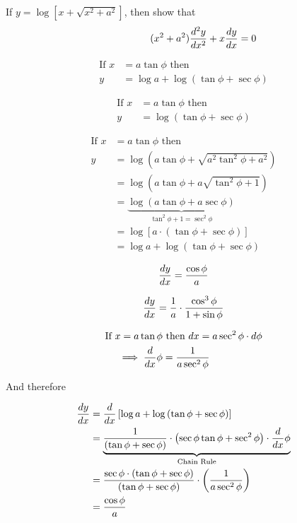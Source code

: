 \documentclass[14pt,fleqn]{extarticle}
\begin{document}
\newcommand\ea{x+\sqrt{x^2+a^2}}
\newcommand\eb{\left(\tan\phi + \sec\phi \right)}
If $y = \log \left[\ea \right]$, then show that 
\[ \qquad\qquad (x^2+a^2)\frac{d^2 y}{dx^2} + x\frac{dy}{dx} = 0 \]
%

\newcard

\begin{align}
	\text{If } x &= a\tan\phi\text{ then } \\
	y &= \log a + \log \left(\tan\phi + \sec\phi \right)
\end{align}

\newcard 

\begin{align}
	\text{If } x &= a\tan\phi\text{ then } \\
	y &= \log \left(\tan\phi + \sec\phi \right)
\end{align}

\newcard 

\begin{align}
	\text{If } x &= a \tan\phi\text{ then } \\
	y &= \log \left(a\tan\phi + \sqrt{a^2\tan^2\phi + a^2} \right) \\
	&= \log \left(a\tan\phi + a\sqrt{\tan^2\phi + 1} \right) \\
	&= \underbrace{\log \left(a\tan\phi + a\sec\phi \right)}_{\tan^2\phi + 1 = \sec^2\phi} \\
	&= \log \left[a\cdot \left(\tan\phi + \sec\phi \right) \right] \\
	&= \log a + \log \left(\tan\phi + \sec\phi \right)
\end{align}


\newcard 

\[ \frac{dy}{dx} = \frac{\cos\phi}{a}\]

\newcard 

\[ \frac{dy}{dx} = \frac{1}{a}\cdot \frac{\cos^3\phi}{1+\sin\phi} \]
\newcard 


\newcard 

\begin{align}
\text{If } x = a\tan\phi &\text{ then } dx = a\sec^2\phi\cdot d\phi \\
\implies \frac{d}{dx}\phi &= \frac{1}{a\sec^2\phi} 
\end{align} 

And therefore 

\begin{align} 
\dydx &= \ddx \left[\log a + \log \eb \right] \\
	&= \underbrace{\frac{1}{\eb}\cdot \left(\sec\phi\tan\phi + \sec^2\phi \right)\cdot \ddx\phi}_{\text{Chain Rule}} \\
	&= \frac{\sec\phi\cdot\eb}{\eb}\cdot \left(\frac{1}{a\sec^2\phi} \right) \\
	&= \frac{\cos\phi}{a}
\end{align}
\end{document}
